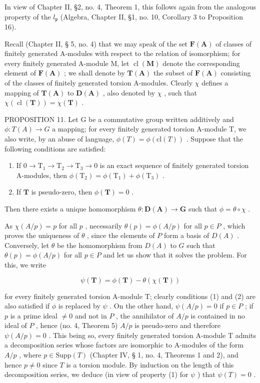 In view of Chapter II, §2, no. 4, Theorem 1, this follows again from the analogous property of the \(l_{\mathfrak{p}}\) (Algebra, Chapter II, §1, no. 10, Corollary 3 to Proposition 16).

Recall (Chapter II, § 5, no. 4) that we may speak of the set \(\mathbf{F}(\mathbf{A})\) of classes of finitely generated A-modules with respect to the relation of isomorphism; for every finitely generated A-module M, let \(\operatorname{cl}(\mathbf{M})\) denote the corresponding element of \(\mathbf{F}(\mathbf{A})\) ; we shall denote by \(\mathbf{T}(\mathbf{A})\) the subset of \(\mathbf{F}(\mathbf{A})\) consisting of the classes of finitely generated torsion A-modules. Clearly \(\chi\) defines a mapping of \(\mathbf{T}(\mathbf{A})\) to \(\mathbf{D}(\mathbf{A})\) , also denoted by \(\chi\) , such that \(\chi(\operatorname{cl}(\mathbf{T})) = \chi(\mathbf{T})\) .

PROPOSITION 11. Let G be a commutative group written additively and \(\phi: T(A) \to G\) a mapping; for every finitely generated torsion A-module T, we also write, by an abuse of language, \(\phi(T) = \phi(\text{cl}(T))\) . Suppose that the following conditions are satisfied:

\begin{enumerate}
\def\labelenumi{(\arabic{enumi})}
\item
  If \(0 \to \mathrm{T}_1 \to \mathrm{T}_2 \to \mathrm{T}_3 \to 0\) is an exact sequence of finitely generated torsion A-modules, then \(\phi(\mathrm{T}_2) = \phi(\mathrm{T}_1) + \phi(\mathrm{T}_3)\) .
\item
  If \(\mathbf{T}\) is pseudo-zero, then \(\phi (\mathbf{T}) = 0\) .
\end{enumerate}

Then there exists a unique homomorphism \(\theta: \mathbf{D}(\mathbf{A}) \to \mathbf{G}\) such that \(\phi = \theta \circ \chi\) .

As \(\chi(A/p) = p\) for all \(p\) , necessarily \(\theta(p) = \phi(A/p)\) for all \(p \in P\) , which proves the uniqueness of \(\theta\) , since the elements of \(P\) form a basis of \(D(A)\) . Conversely, let \(\theta\) be the homomorphism from \(D(A)\) to \(G\) such that \(\theta(p) = \phi(A/p)\) for all \(p \in P\) and let us show that it solves the problem. For this, we write

\[
\psi (\mathbf {T}) = \phi (\mathbf {T}) - \theta (\chi (\mathbf {T}))
\]

for every finitely generated torsion A-module T; clearly conditions (1) and (2) are also satisfied if \(\phi\) is replaced by \(\psi\) . On the other hand, \(\psi(A/p) = 0\) if \(p \in P\) ; if \(p\) is a prime ideal \(\neq 0\) and not in \(P\) , the annihilator of \(A/p\) is contained in no ideal of \(P\) , hence (no. 4, Theorem 5) \(A/p\) is pseudo-zero and therefore \(\psi(A/p) = 0\) . This being so, every finitely generated torsion A-module T admits a decomposition series whose factors are isomorphic to A-modules of the form \(A/p\) , where \(p \in \text{Supp}(T)\) (Chapter IV, § 1, no. 4, Theorems 1 and 2), and hence \(p \neq 0\) since \(T\) is a torsion module. By induction on the length of this decomposition series, we deduce (in view of property (1) for \(\psi\) ) that \(\psi(T) = 0\) .


